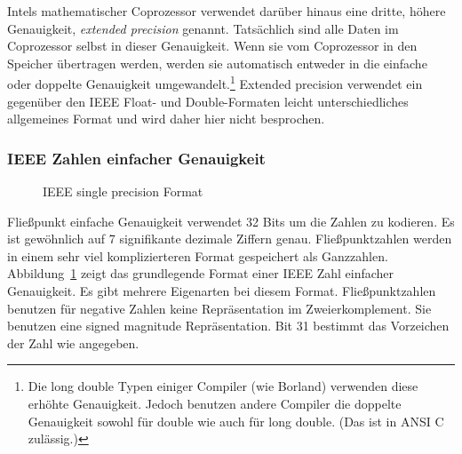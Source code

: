 Intels mathematischer Coprozessor verwendet dar\"{u}ber hinaus eine
dritte, h\"{o}here Genauigkeit, \emph{extended precision} genannt.
Tats\"{a}chlich sind alle Daten im Coprozessor selbst in dieser
Genauigkeit. Wenn sie vom Coprozessor in den Speicher \"{u}bertragen
werden, werden sie automatisch entweder in die einfache oder
doppelte Genauigkeit umgewandelt.\footnote{Die {\code long double}
Typen einiger Compiler (wie Borland) 
verwenden diese erh\"{o}hte Genauigkeit. Jedoch benutzen andere Compiler
die doppelte Genauigkeit sowohl f\"{u}r {\code double} wie auch f\"{u}r
{\code long double}. (Das ist in ANSI C zul\"{a}ssig.)} Extended
precision verwendet ein gegen\"{u}ber den IEEE Float- und
Double-Formaten leicht unterschiedliches allgemeines Format und wird
daher hier nicht besprochen.

\subsubsection{IEEE Zahlen einfacher Genauigkeit} 

\begin{figure}[t]
\fbox{
\centering
\parbox{118mm}{
\begin{tabular}{|c|c|c|}
 \multicolumn{1}{p{0.3cm}}{31} &
 \multicolumn{1}{p{2.5cm}}{30 \hfill 23} &
 \multicolumn{1}{p{6cm}}{22 \hfill 0} \\
 \hline
 s & e & f \\
 \hline
\end{tabular}
\\[0.4cm]
\begin{tabular}{cp{106.3mm}}
 s & Vorzeichenbit - 0 = positiv, 1 = negativ \\
 e & biased Exponent (8 Bits) = wahrer Exponent + 7F (127 dezimal).
  Die Werte 00 und FF haben eine spezielle Bedeutung (siehe Text). \\
 f & Bruchteil - die ersten 23 Bits nach dem 1.\ in der Signifikanten.
\end{tabular}
}} \caption{IEEE single precision Format \label{fig:IEEEsingle}}
\end{figure}

Flie{\ss}punkt einfache Genauigkeit verwendet 32 Bits um die Zahlen zu
kodieren. Es ist gew\"{o}hnlich auf 7 signifikante dezimale Ziffern
genau. Flie{\ss}punktzahlen werden in einem sehr viel komplizierteren
Format gespeichert als Ganzzahlen. Abbildung~\ref{fig:IEEEsingle}
zeigt das grundlegende Format einer IEEE Zahl einfacher Genauigkeit.
Es gibt mehrere Eigenarten bei diesem Format. Flie{\ss}punktzahlen
benutzen f\"{u}r negative Zahlen keine Repr\"{a}sentation im
Zweierkomplement. Sie benutzen eine signed magnitude Repr\"{a}sentation.
Bit 31 bestimmt das Vorzeichen der Zahl wie angegeben.

